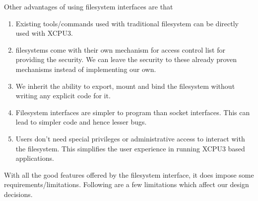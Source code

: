 Other advantages of using filesystem interfaces are that 
\begin{enumerate}
\item Existing tools/commands used with traditional filesystem can be directly
used with XCPU3.

\item filesystems come with their own mechanism for access control list for
providing the security.  We can leave the security to these already proven 
mechanisms instead of implementing our own.

\item We inherit the ability to export, mount and bind the filesystem
without writing any explicit code for it.

\item Filesystem interfaces are simpler to program than socket interfaces.  This
can lead to simpler code and hence lesser bugs.

\item Users don't need special privileges or administrative access to interact
with the filesystem.  This simplifies the user experience in running XCPU3 based
applications.
\end{enumerate}

With all the good features offered by the filesystem interface, it does impose
some requirements/limitations. Following are a few limitations which affect our design
decisions.

